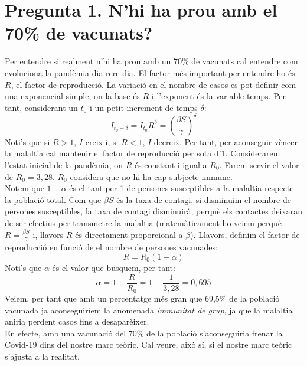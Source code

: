 \documentclass[a4paper, 11pt]{article}
\begin{document}
\section{Pregunta 1. N'hi ha prou amb el 70\% de vacunats?}
  Per entendre si realment n'hi ha prou amb un 70\% de vacunats cal entendre com evoluciona la pandèmia dia rere dia. El factor més important per entendre-ho és $R$, el factor de reproducció. La variació en el nombre de casos es pot definir com una exponencial simple, on la base és $R$ i l'exponent és la variable temps. Per tant, considerant un $t_0$ i un petit increment de temps $\delta$:
  \begin{equation}
    I_{t_{0} + \delta} = I_{t_{0}} R^{\delta} = \left( \frac{\beta S}{\gamma} \right) ^{\delta}
  \end{equation}
  Noti's que si $R > 1$, $I$ creix i, si $R < 1$, $I$ decreix.
  Per tant, per aconseguir vèncer la malaltia cal mantenir el factor de reproducció per sota d'$1$. Considerarem l'estat inicial de la pandèmia, on $R$ és constant i igual a $R_0$. Farem servir el valor de $R_0 = 3,28$\cite{jtm}. $R_0$ considera que no hi ha cap subjecte immune.\\
  Notem que $1 - \alpha$ és el tant per 1 de persones susceptibles a la malaltia respecte la població total. Com que $\beta S$ és la taxa de contagi, si disminuim el nombre de persones susceptibles, la taxa de contagi disminuirà, perquè els contactes deixaran de ser efectius per transmetre la malaltia (matemàticament ho veiem perquè $R = \frac{\beta S}{\gamma}$ i, llavors $R$ és directament proporcional a $\beta$). Llavors, definim el factor de reproducció en funció de el nombre de persones vacunades:
  \begin{equation}
    R = R_0 \left( 1 - \alpha \right)
  \end{equation}
  Noti's que $\alpha$ és el valor que busquem, per tant:
  \begin{equation}
    \alpha = 1 - \frac{R}{R_0} = 1 - \frac{1}{3,28} = 0,695
  \end{equation}
  Veiem, per tant que amb un percentatge més gran que 69,5\% de la població vacunada ja aconseguiríem la anomenada \textit{immunitat de grup}\cite{herd}, ja que la malaltia aniria perdent casos fins a desaparèixer.\\
  En efecte, amb una vacunació del 70\% de la població s'aconseguiria frenar la Covid-19 dins del nostre marc teòric. Cal veure, això sí, si el nostre marc teòric s'ajusta a la realitat.
\end{document}
